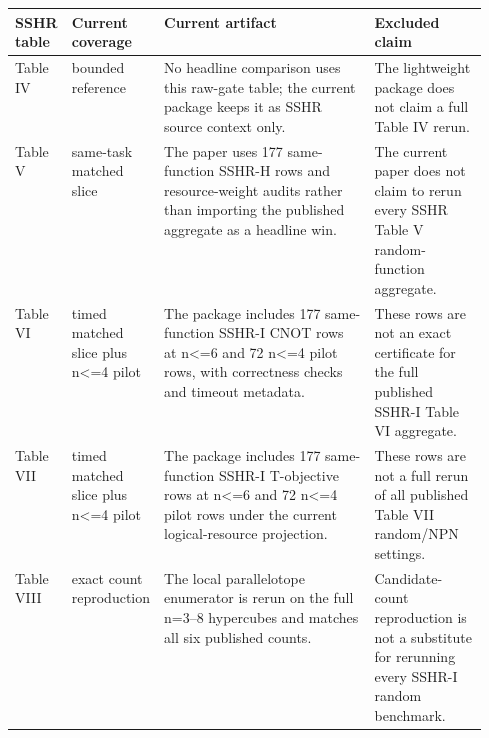 \begin{tabularx}{\linewidth}{>{\raggedright\arraybackslash}p{0.12\linewidth}>{\raggedright\arraybackslash}p{0.19\linewidth}>{\raggedright\arraybackslash}X>{\raggedright\arraybackslash}p{0.24\linewidth}}
\toprule
SSHR table & Current coverage & Current artifact & Excluded claim \\
\midrule
Table IV & bounded reference & No headline comparison uses this raw-gate table; the current package keeps it as SSHR source context only. & The lightweight package does not claim a full Table IV rerun. \\
Table V & same-task matched slice & The paper uses 177 same-function SSHR-H rows and resource-weight audits rather than importing the published aggregate as a headline win. & The current paper does not claim to rerun every SSHR Table V random-function aggregate. \\
Table VI & timed matched slice plus n<=4 pilot & The package includes 177 same-function SSHR-I CNOT rows at n<=6 and 72 n<=4 pilot rows, with correctness checks and timeout metadata. & These rows are not an exact certificate for the full published SSHR-I Table VI aggregate. \\
Table VII & timed matched slice plus n<=4 pilot & The package includes 177 same-function SSHR-I T-objective rows at n<=6 and 72 n<=4 pilot rows under the current logical-resource projection. & These rows are not a full rerun of all published Table VII random/NPN settings. \\
Table VIII & exact count reproduction & The local parallelotope enumerator is rerun on the full n=3--8 hypercubes and matches all six published counts. & Candidate-count reproduction is not a substitute for rerunning every SSHR-I random benchmark. \\
\bottomrule
\end{tabularx}
